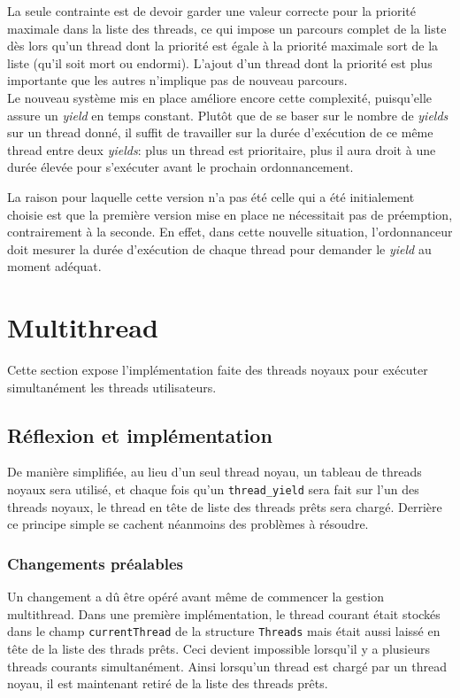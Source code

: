 \documentclass[a4paper,11pt]{article}
\begin{document}
La seule contrainte est de devoir garder une valeur correcte pour la priorité maximale dans la liste des threads, ce qui impose un parcours complet de la liste dès lors qu'un thread dont la priorité est égale à la priorité maximale sort de la liste (qu'il soit mort ou endormi). L'ajout d'un thread dont la priorité est plus importante que les autres n'implique pas de nouveau parcours.\\

Le nouveau système mis en place améliore encore cette complexité, puisqu'elle assure un \textit{yield} en temps constant. Plutôt que de se baser sur le nombre de \textit{yields} sur un thread donné, il suffit de travailler sur la durée d'exécution de ce même thread entre deux \textit{yields}: plus un thread est prioritaire, plus il aura droit à une durée élevée pour s'exécuter avant le prochain ordonnancement.

La raison pour laquelle cette version n'a pas été celle qui a été initialement choisie est que la première version mise en place ne nécessitait pas de préemption, contrairement à la seconde. En effet, dans cette nouvelle situation, l'ordonnanceur doit mesurer la durée d'exécution de chaque thread pour demander le \textit{yield} au moment adéquat.


\section{Multithread}

Cette section expose l'implémentation faite des threads noyaux pour exécuter simultanément les threads utilisateurs.

\subsection{Réflexion et implémentation}

De manière simplifiée, au lieu d'un seul thread noyau, un tableau de threads noyaux sera utilisé, et chaque fois qu'un \texttt{thread\_yield} sera fait sur l'un des threads noyaux, le thread en tête de liste des threads prêts sera chargé. Derrière ce principe simple se cachent néanmoins des problèmes à résoudre.

\subsubsection*{Changements préalables}

Un changement a dû être opéré avant même de commencer la gestion multithread. Dans une première implémentation, le thread courant était stockés dans le champ \texttt{currentThread} de la structure \texttt{Threads} mais était aussi laissé en tête de la liste des thrads prêts. Ceci devient impossible lorsqu'il y a plusieurs threads courants simultanément. Ainsi lorsqu'un thread est chargé par un thread noyau, il est maintenant retiré de la liste des threads prêts.
\end{document}
